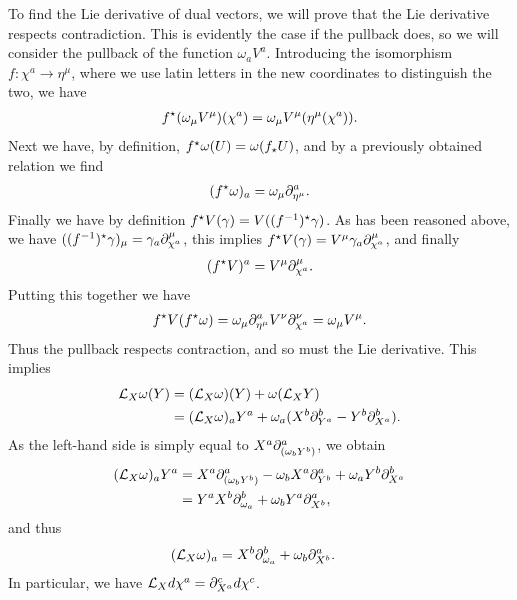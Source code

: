 To find the Lie derivative of dual vectors, we will prove that the Lie derivative respects contradiction. This is evidently the case if the pullback does, so we will consider the pullback of the function $\omega_{a}V^{a}$. Introducing the isomorphism $f: \chi^{a}\to\eta^{\mu}$, where we use latin letters in the new coordinates to distinguish the two, we have
\begin{align*}
	f^{\star}(\omega_{\mu}V^{\mu})(\chi^{a}) = \omega_{\mu}V^{\mu}(\eta^{\mu}(\chi^{a})).
\end{align*}
Next we have, by definition, $f^{\star}\omega(U) = \omega(f_{\star}U)$, and by a previously obtained relation we find
\begin{align*}
	(f^{\star}\omega)_{a} = \omega_{\mu}\partial^{a}_{\eta^{\mu}}.
\end{align*}
Finally we have by definition $f^{\star}V(\gamma) = V((f^{-1})^{\star}\gamma)$. As has been reasoned above, we have $((f^{-1})^{\star}\gamma)_{\mu} = \gamma_{a}\partial^{\mu}_{\chi^{a}}$, this implies $f^{\star}V(\gamma) = V^{\mu}\gamma_{a}\partial^{\mu}_{\chi^{a}}$, and finally
\begin{align*}
	(f^{\star}V)^{a} = V^{\mu}\partial^{\mu}_{\chi^{a}}.
\end{align*}
Putting this together we have
\begin{align*}
	f^{\star}V(f^{\star}\omega) = \omega_{\mu}\partial^{a}_{\eta^{\mu}}V^{\nu}\partial^{\nu}_{\chi^{a}} = \omega_{\mu}V^{\mu}.
\end{align*}
Thus the pullback respects contraction, and so must the Lie derivative. This implies
\begin{align*}
	\mathcal{L}_{X}\omega(Y) &= (\mathcal{L}_{X}\omega)(Y) + \omega(\mathcal{L}_{X}Y) \\
	                    &= (\mathcal{L}_{X}\omega)_{a}Y^{a} + \omega_{a}(X^{b}\partial^{b}_{Y^{a}} - Y^{b}\partial^{b}_{X^{a}}).
\end{align*}
As the left-hand side is simply equal to $X^{a}\partial^{a}_{(\omega_{b}Y^{b})}$, we obtain
\begin{align*}
	(\mathcal{L}_{X}\omega)_{a}Y^{a} &= X^{a}\partial^{a}_{(\omega_{b}Y^{b})} - \omega_{b}X^{a}\partial^{a}_{Y^{b}} + \omega_{a}Y^{b}\partial^{b}_{X^{a}} \\
&= Y^{a}X^{b}\partial^{b}_{\omega_{a}} + \omega_{b}Y^{a}\partial^{a}_{X^{b}},
\end{align*}
and thus
\begin{align*}
	(\mathcal{L}_{X}\omega)_{a} &= X^{b}\partial^{b}_{\omega_{a}} + \omega_{b}\partial^{a}_{X^{b}}.
\end{align*}
In particular, we have $\mathcal{L}_{X}d\chi^{a} = \partial^{c}_{X^{a}}d\chi^{c}$.

